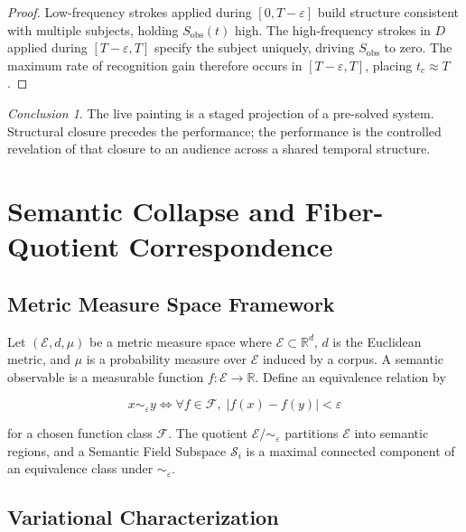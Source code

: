 \documentclass[11pt, twoside]{article}
\theoremstyle{plain}
\theoremstyle{definition}
\theoremstyle{remark}
\newtheorem{conclusion}[theorem]{Conclusion}
\begin{document}
\begin{proof}
Low-frequency strokes applied during $[0, T - \varepsilon]$ build structure consistent with multiple subjects, holding $S_{\text{obs}}(t)$ high. The high-frequency strokes in $D$ applied during $[T - \varepsilon, T]$ specify the subject uniquely, driving $S_{\text{obs}}$ to zero. The maximum rate of recognition gain therefore occurs in $[T - \varepsilon, T]$, placing $t_c \approx T$.
\end{proof}

\begin{conclusion}
The live painting is a staged projection of a pre-solved system. Structural closure precedes the performance; the performance is the controlled revelation of that closure to an audience across a shared temporal structure.
\end{conclusion}

\section{Semantic Collapse and Fiber-Quotient Correspondence}
\label{app:collapse_formal}

\subsection{Metric Measure Space Framework}

Let $(\mathcal{E}, d, \mu)$ be a metric measure space where $\mathcal{E} \subset \mathbb{R}^d$, $d$ is the Euclidean metric, and $\mu$ is a probability measure over $\mathcal{E}$ induced by a corpus. A semantic observable is a measurable function $f : \mathcal{E} \to \mathbb{R}$. Define an equivalence relation by

\[
x \sim_\varepsilon y \iff \forall f \in \mathcal{F},\; |f(x) - f(y)| < \varepsilon
\]

for a chosen function class $\mathcal{F}$. The quotient $\mathcal{E} / {\sim_\varepsilon}$ partitions $\mathcal{E}$ into semantic regions, and a Semantic Field Subspace $\mathcal{S}_i$ is a maximal connected component of an equivalence class under $\sim_\varepsilon$.

\subsection{Variational Characterization}
\end{document}
